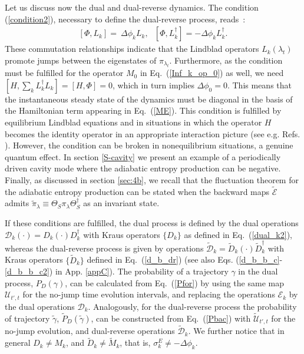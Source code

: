 \documentclass[aps,prx,twocolumn,showpacs,floatfix,superscriptaddress,graphics,longbibliography]{revtex4-1}
\newcommand{\E}{{\mathcal E}}
\newcommand{\D}{{\mathcal D}}
\newcommand{\HAT}{}
\begin{document}
Let us discuss now the dual and dual-reverse dynamics.
The condition (\ref{condition2}), necessary to define the dual-reverse process, reads~\cite{JordanParrondo,JordanSagawa}:
\begin{eqnarray} \label{conditionrelations}
[\HAT{\Phi}, \HAT{L}_k ] = ~\Delta \phi_k \HAT{L}_k, ~~~ [\HAT{\Phi}, \HAT{L}_k^\dagger ] = - \Delta \phi_k \HAT{L}_k^\dagger.
\end{eqnarray} 
These commutation relationships indicate that the Lindblad operators $\HAT{L}_k(\lambda_t)$ promote jumps between the eigenstates of $\pi_{\lambda_t}$. Furthermore,
as the condition must be fulfilled for the operator $M_0$ in Eq.~(\ref{Inf_k_op_0}) as well, we need $[H, \sum_k L_k^\dagger L_k] = [H, \HAT{\Phi}] = 0$, which 
in turn implies $\Delta \phi_0 = 0$.  This means that the instantaneous  steady state of the dynamics must be diagonal in the basis of the Hamiltonian term appearing in Eq.~(\ref{ME}). 
This condition is fulfilled by equilibrium Lindblad equations and in situations in which the operator $H$ becomes the identity operator in an appropriate interaction picture 
(see e.g. Refs. \cite{SqzRes, Szczygielski:2013wc}). However, the condition can be broken in nonequilibrium situations, a genuine quantum effect. In section \ref{S-cavity} we present an example of a periodically driven cavity mode where the adiabatic entropy production can be negative.
Finally, as discussed in section \ref{sec:4b}, we recall that the fluctuation theorem for the adiabatic entropy production can be 
stated when the backward maps $\tilde{\E}$ admits $\tilde{\pi}_\lambda \equiv \Theta_S \pi_\lambda \Theta_S^\dagger$ as an invariant state.

If these conditions are fulfilled, the dual process  is defined by the dual operations $\D_{k}(\cdot) = D_k (\cdot) D_k^\dagger$ with Kraus 
operators $\{ D_{k} \}$ as defined in Eq.~(\ref{dual_k2}), whereas the dual-reverse process is given by operations $\tilde{\D}_k = \tilde{D}_k (\cdot) \tilde{D}_k^\dagger$ 
with Kraus operators $\{ \tilde{D}_k \}$ defined in Eq.~(\ref{d_b_dr}) (see also Eqs. (\ref{d_b_b_c}-\ref{d_b_b_c2}) in App. \ref{appC}). The probability of a trajectory $\gamma$ in 
the dual process, $P_D(\gamma)$, can be calculated from Eq.~(\ref{Pfor}) by using the same map $\mathcal{U}_{t',t}$ for 
the no-jump time evolution intervals, and replacing the operations $\E_{k}$ by the dual operations $\D_{k}$.
Analogously, for the dual-reverse process the probability of trajectory $\tilde{\gamma}$, $\tilde{P}_D (\tilde{\gamma})$, can be constructed from Eq.~(\ref{Pbac}) with 
$\tilde{\mathcal{U}}_{t', t}$ for the no-jump evolution, and dual-reverse operations $\tilde{\D}_k$. 
We further notice that in general $D_k \neq M_k$, and $\tilde{D}_k \neq \tilde{M}_k$, that is, $\sigma_k^E \neq - \Delta \phi_k$. 
\end{document}
